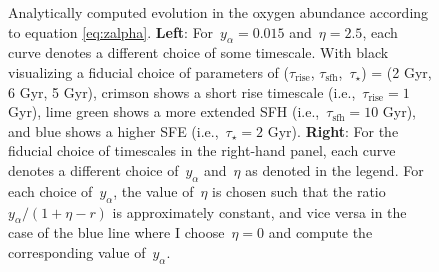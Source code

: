 \documentclass[12pt]{article}
\newcommand{\timescale}[1]{\ensuremath{\tau_\text{#1}}}
\begin{document}
\begin{figure}
\caption{
Analytically computed evolution in the oxygen abundance according to equation
\ref{eq:zalpha}.
\textbf{Left}: For~$y_\alpha = 0.015$ and~$\eta = 2.5$, each curve denotes a
different choice of some timescale.
With black visualizing a fiducial choice of parameters of (\timescale{rise},
\timescale{sfh},~$\tau_\star$) = (2 Gyr, 6 Gyr, 5 Gyr), crimson shows a short
rise timescale (i.e.,~$\timescale{rise} = 1$ Gyr), lime green shows a more
extended SFH (i.e.,~$\timescale{sfh} = 10$ Gyr), and blue shows a higher SFE
(i.e.,~$\tau_\star = 2$ Gyr).
\textbf{Right}: For the fiducial choice of timescales in the right-hand panel,
each curve denotes a different choice of~$y_\alpha$ and~$\eta$ as denoted in
the legend.
For each choice of~$y_\alpha$, the value of~$\eta$ is chosen such that the
ratio~$y_\alpha / (1 + \eta - r)$ is approximately constant, and vice versa in
the case of the blue line where I choose~$\eta = 0$ and compute the
corresponding value of~$y_\alpha$.
}
\label{fig:analytic-evolution}
\end{figure}
\end{document}
